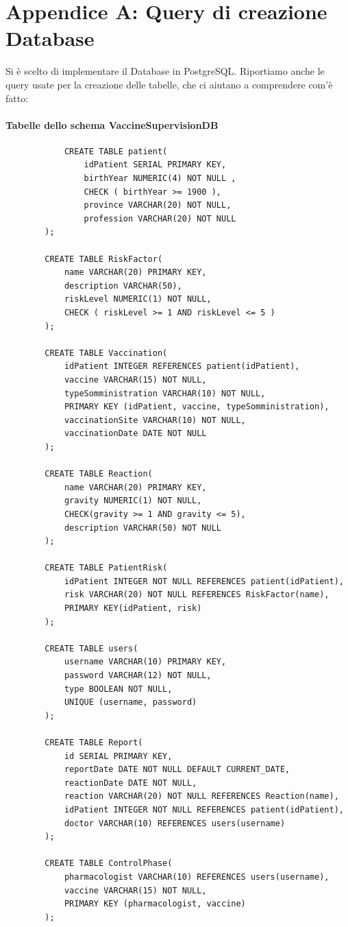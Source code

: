 \documentclass{article}
\begin{document}
\newpage
    \section*{Appendice A: Query di creazione Database}

    Si è scelto di implementare il Database in PostgreSQL. Riportiamo anche le query usate per la creazione delle tabelle, che ci aiutano a comprendere com'è fatto:
    \paragraph*{Tabelle dello schema VaccineSupervisionDB}
        \begin{verbatim}
            CREATE TABLE patient(
                idPatient SERIAL PRIMARY KEY,
                birthYear NUMERIC(4) NOT NULL ,
                CHECK ( birthYear >= 1900 ),
                province VARCHAR(20) NOT NULL,
                profession VARCHAR(20) NOT NULL
        );
        
        CREATE TABLE RiskFactor(
            name VARCHAR(20) PRIMARY KEY,
            description VARCHAR(50),
            riskLevel NUMERIC(1) NOT NULL,
            CHECK ( riskLevel >= 1 AND riskLevel <= 5 )
        );
        
        CREATE TABLE Vaccination(
            idPatient INTEGER REFERENCES patient(idPatient),
            vaccine VARCHAR(15) NOT NULL,
            typeSomministration VARCHAR(10) NOT NULL,
            PRIMARY KEY (idPatient, vaccine, typeSomministration),
            vaccinationSite VARCHAR(10) NOT NULL,
            vaccinationDate DATE NOT NULL
        );
        
        CREATE TABLE Reaction(
            name VARCHAR(20) PRIMARY KEY,
            gravity NUMERIC(1) NOT NULL,
            CHECK(gravity >= 1 AND gravity <= 5),
            description VARCHAR(50) NOT NULL
        );
        
        CREATE TABLE PatientRisk(
            idPatient INTEGER NOT NULL REFERENCES patient(idPatient),
            risk VARCHAR(20) NOT NULL REFERENCES RiskFactor(name),
            PRIMARY KEY(idPatient, risk)
        );
        
        CREATE TABLE users(
            username VARCHAR(10) PRIMARY KEY,
            password VARCHAR(12) NOT NULL,
            type BOOLEAN NOT NULL,
            UNIQUE (username, password)
        );
        
        CREATE TABLE Report(
            id SERIAL PRIMARY KEY,
            reportDate DATE NOT NULL DEFAULT CURRENT_DATE,
            reactionDate DATE NOT NULL,
            reaction VARCHAR(20) NOT NULL REFERENCES Reaction(name),
            idPatient INTEGER NOT NULL REFERENCES patient(idPatient),
            doctor VARCHAR(10) REFERENCES users(username)
        );
        
        CREATE TABLE ControlPhase(
            pharmacologist VARCHAR(10) REFERENCES users(username),
            vaccine VARCHAR(15) NOT NULL,
            PRIMARY KEY (pharmacologist, vaccine)
        );
        \end{verbatim}
\end{document}

